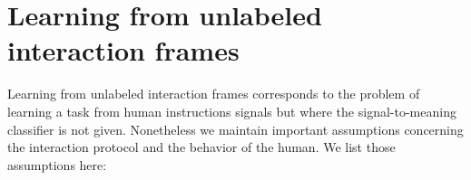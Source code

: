 


\section{Learning from unlabeled interaction frames}
\label{chapter:introduction:lfui}

Learning from unlabeled interaction frames corresponds to the problem of learning a task from human instructions signals but where the signal-to-meaning classifier is not given. Nonetheless we maintain important assumptions concerning the interaction protocol and the behavior of the human. We list those assumptions here:

